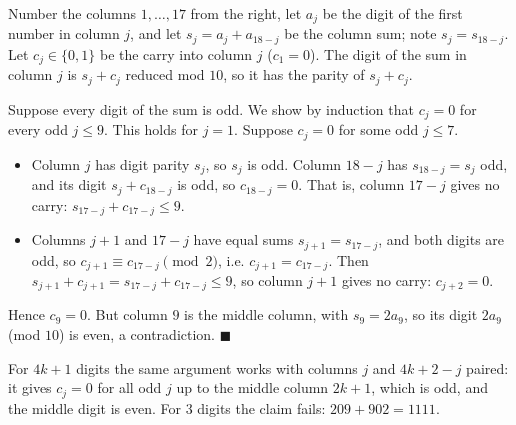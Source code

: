 Number the columns $1,\dots,17$ from the right, let $a_j$ be the digit of the first number in column $j$, and let $s_j=a_j+a_{18-j}$ be the column sum; note $s_j=s_{18-j}$. Let $c_j\in\{0,1\}$ be the carry into column $j$ ($c_1=0$). The digit of the sum in column $j$ is $s_j+c_j$ reduced mod $10$, so it has the parity of $s_j+c_j$.

Suppose every digit of the sum is odd. We show by induction that $c_j=0$ for every odd $j\le9$. This holds for $j=1$. Suppose $c_j=0$ for some odd $j\le7$.
\begin{itemize}
\item Column $j$ has digit parity $s_j$, so $s_j$ is odd. Column $18-j$ has $s_{18-j}=s_j$ odd, and its digit $s_j+c_{18-j}$ is odd, so $c_{18-j}=0$. That is, column $17-j$ gives no carry: $s_{17-j}+c_{17-j}\le9$.
\item Columns $j+1$ and $17-j$ have equal sums $s_{j+1}=s_{17-j}$, and both digits are odd, so $c_{j+1}\equiv c_{17-j}\pmod 2$, i.e. $c_{j+1}=c_{17-j}$. Then $s_{j+1}+c_{j+1}=s_{17-j}+c_{17-j}\le9$, so column $j+1$ gives no carry: $c_{j+2}=0$.
\end{itemize}
Hence $c_9=0$. But column $9$ is the middle column, with $s_9=2a_9$, so its digit $2a_9$ (mod $10$) is even, a contradiction. $\blacksquare$

For $4k+1$ digits the same argument works with columns $j$ and $4k+2-j$ paired: it gives $c_j=0$ for all odd $j$ up to the middle column $2k+1$, which is odd, and the middle digit is even. For $3$ digits the claim fails: $209+902=1111$.
